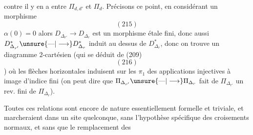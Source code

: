 contre il y en a entre $\Pi_{d,d'}$ et $\Pi_d$.
Précisons ce point, en considérant un
morphisme
\[
(215)
\]
 $\alpha(0)=0$
alors $D_{\Delta_{r'}}\longrightarrow D_{\Delta_r}$ est un morphisme
étale fini, donc aussi $D^*_{\Delta_{r'}}\unsure{\text{---}|\longrightarrow}D^*_{\Delta_r}$ induit
au dessus de $D^*_{\Delta_r}$, donc on trouve
un diagramme $2$-cartésien (qui 
  se déduit de (209)
\[
(216)
\]
)
où les flèches horizontales induisent sur
les $\pi_1$ des applications injectives à
image d'indice fini (on peut dire que
$\Pi_{\Delta_{r'}}\unsure{\text{---}|\longrightarrow}\Pi_{\Delta_r}$ fait de $\Pi_{\Delta_{r'}}$ un
rev. fini de $\Pi_{\Delta_r}$).

Toutes ces relations sont encore de
nature essentiellement formelle et triviale,
et marcheraient dans un site quelconque,
sans l'hypothèse spécifique des croisements
normaux, et sans que le remplacement des
